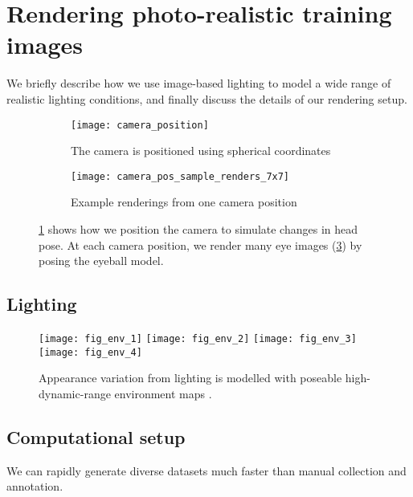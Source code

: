 
\section{Rendering photo-realistic training images}

We briefly describe how we use image-based lighting \cite{debevec2002image} to model a wide range of realistic lighting conditions, and finally discuss the details of our rendering setup.

\begin{figure}
    \centering
    \begin{subfigure}[t]{0.48\columnwidth}
        \texttt{[image: camera\_position]}
        \caption{The camera is positioned using spherical coordinates}
        \label{fig:cam_pos_spher_coords}
    \end{subfigure}
    \hfill
    \begin{subfigure}[t]{0.48\columnwidth}
        \texttt{[image: camera\_pos\_sample\_renders\_7x7]}
        \caption{Example renderings from one camera position}
        \label{fig:cam_pos_example_renders}
    \end{subfigure}
    \caption{\ref{fig:cam_pos_spher_coords} shows how we position the camera to simulate changes in head pose. At each camera position, we render many eye images (\ref{fig:cam_pos_example_renders}) by posing the eyeball model.}
\end{figure}

\subsection{Lighting}

\begin{figure}
    \texttt{[image: fig\_env\_1]} \hfill
    \texttt{[image: fig\_env\_2]} \hfill
    \texttt{[image: fig\_env\_3]} \hfill
    \texttt{[image: fig\_env\_4]}
    \caption{Appearance variation from lighting is modelled with poseable high-dynamic-range environment maps \cite{debevec2002image}.}
    \label{fig:participants}
\end{figure}

\subsection{Computational setup}

We can rapidly generate diverse datasets much faster than manual collection and annotation.